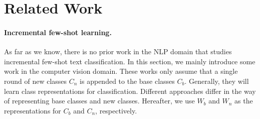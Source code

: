 \documentclass[11pt]{article}
\begin{document}





\section{Related Work}
\label{sec:relatedwork}
\paragraph{Incremental few-shot learning.} As far as we know, there is no prior work in the NLP domain that studies incremental few-shot text classification. In this section, we mainly introduce some work in the computer vision domain. These works only assume that a single round of new classes $C_n$ is appended to the base classes $C_b$. Generally, they will learn class representations for classification.
Different approaches differ in the way of representing base classes and new classes. Hereafter, we use $W_b$ and $W_n$ as the representations for $C_b$ and $C_n$, respectively.

\end{document}
